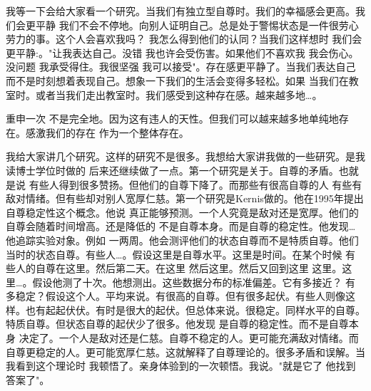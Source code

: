 我等一下会给大家看一个研究。当我们有独立型自尊时。我们的幸福感会更高。我们会更平静 我们不会不停地。向别人证明自己。总是处于警惕状态是一件很劳心劳力的事。这个人会喜欢我吗？ 我怎么得到他们的认同？当我们这样想时 我们会更平静:。"让我表达自己。没错 我也许会受伤害。如果他们不喜欢我 我会伤心。没问题 我承受得住。我很坚强 我可以接受"。存在感更平静了。当我们表达自己 而不是时刻想着表现自己。想象一下我们的生活会变得多轻松。如果 当我们在教室时。或者当我们走出教室时。我们感受到这种存在感。越来越多地…。 

重申一次 不是完全地。因为这有违人的天性。但我们可以越来越多地单纯地存在。感激我们的存在 作为一个整体存在。 

我给大家讲几个研究。这样的研究不是很多。我想给大家讲我做的一些研究。是我读博士学位时做的 后来还继续做了一点。第一个研究是关于。自尊的矛盾。也就是说 有些人得到很多赞扬。但他们的自尊下降了。而那些有很高自尊的人 有些有敌对情绪。但有些却对别人宽厚仁慈。第一个研究是Kernis做的。他在1995年提出自尊稳定性这个概念。他说 真正能够预测。一个人究竟是敌对还是宽厚。他们的自尊会随着时间增高。还是降低的 不是自尊本身。而是自尊的稳定性。他发现…他追踪实验对象。例如 一两周。他会测评他们的状态自尊而不是特质自尊。他们当时的状态自尊。有些人…。假设这里是自尊水平。这里是时间。在某个时候 有些人的自尊在这里。然后第二天。在这里 然后这里。然后又回到这里 这里。这里…。假设他测了十次。他想测出。这些数据分布的标准偏差。它有多接近？ 有多稳定？假设这个人。平均来说。有很高的自尊。但有很多起伏。有些人则像这样。也有起起伏伏。有时是很大的起伏。但总体来说。很稳定。同样水平的自尊。特质自尊。但状态自尊的起伏少了很多。他发现 是自尊的稳定性。而不是自尊本身 决定了。一个人是敌对还是仁慈。自尊不稳定的人。更可能充满敌对情绪。而自尊更稳定的人。更可能宽厚仁慈。这就解释了自尊理论的。很多矛盾和误解。当我看到这个理论时 我顿悟了。亲身体验到的一次顿悟。我说。"就是它了 他找到答案了"。 


